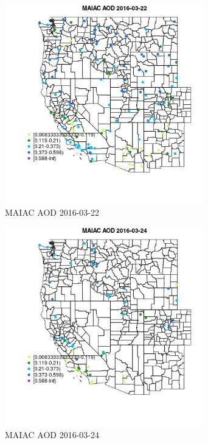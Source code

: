 \begin{figure} 
\centering  
\includegraphics[width=0.77\textwidth]{Code_Outputs/Report_ML_input_PM25_Step4_part_e_de_duplicated_aveswNAs_MapObsMAIAC_AOD2016-03-22.jpg} 
\caption{\label{fig:Report_ML_input_PM25_Step4_part_e_de_duplicated_aveswNAsMapObsMAIAC_AOD2016-03-22}MAIAC AOD 2016-03-22} 
\end{figure} 
 

\begin{figure} 
\centering  
\includegraphics[width=0.77\textwidth]{Code_Outputs/Report_ML_input_PM25_Step4_part_e_de_duplicated_aveswNAs_MapObsMAIAC_AOD2016-03-24.jpg} 
\caption{\label{fig:Report_ML_input_PM25_Step4_part_e_de_duplicated_aveswNAsMapObsMAIAC_AOD2016-03-24}MAIAC AOD 2016-03-24} 
\end{figure} 
 

